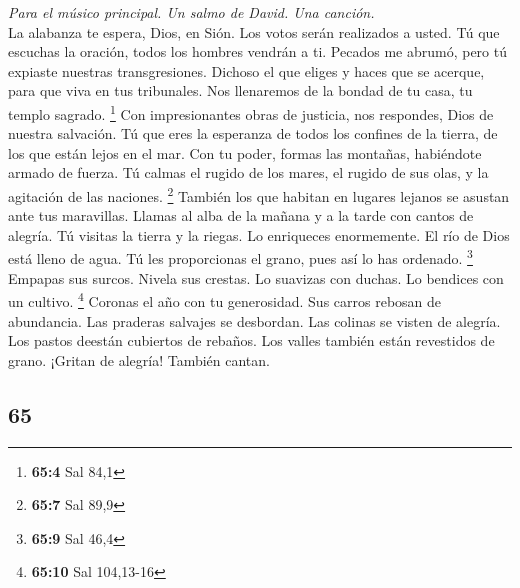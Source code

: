 \begin{paracol}{2}
\emph{Para el músico principal. Un salmo de David. Una canción.}\\
 La alabanza te espera, Dios, en Sión. Los votos serán
realizados a usted.  Tú que escuchas la oración, todos los
hombres vendrán a ti.  Pecados me abrumó, pero tú expiaste
nuestras transgresiones.  Dichoso el que eliges y haces
que se acerque, para que viva en tus tribunales. Nos llenaremos de la
bondad de tu casa, tu templo sagrado. \footnote{\textbf{65:4} Sal 84,1}
 Con impresionantes obras de justicia, nos respondes, Dios
de nuestra salvación. Tú que eres la esperanza de todos los confines de
la tierra, de los que están lejos en el mar.  Con tu
poder, formas las montañas, habiéndote armado de fuerza. 
Tú calmas el rugido de los mares, el rugido de sus olas, y la agitación
de las naciones. \footnote{\textbf{65:7} Sal 89,9} 
También los que habitan en lugares lejanos se asustan ante tus
maravillas. Llamas al alba de la mañana y a la tarde con cantos de
alegría.  Tú visitas la tierra y la riegas. Lo enriqueces
enormemente. El río de Dios está lleno de agua. Tú les proporcionas el
grano, pues así lo has ordenado. \footnote{\textbf{65:9} Sal 46,4}
 Empapas sus surcos. Nivela sus crestas. Lo suavizas con
duchas. Lo bendices con un cultivo. \footnote{\textbf{65:10} Sal
  104,13-16}  Coronas el año con tu generosidad. Sus
carros rebosan de abundancia.  Las praderas salvajes se
desbordan. Las colinas se visten de alegría.  Los pastos
deestán cubiertos de rebaños. Los valles también están revestidos de
grano. ¡Gritan de alegría! También cantan.

\switchcolumn
\begin{otherlanguage}{english}

\hypertarget{section-129}{%
\section{65}\label{section-129}}


\end{otherlanguage}
\end{paracol}
